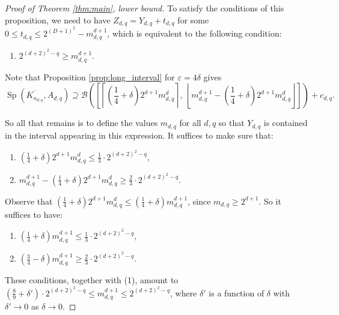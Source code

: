 \documentclass[10pt,a4paper]{article}
\numberwithin{equation}{section}
\newcommand{\eps}{\varepsilon}
\newcommand{\cB}{\mathcal{B}}
\DeclareMathOperator{\Sp}{Sp}
\begin{document}
\begin{proof}[Proof of Theorem \ref{thm:main}, lower bound]
To satisfy the conditions of this proposition, we need to have $Z_{d,q}=Y_{d,q}+t_{d,q}$ for some $0\le t_{d,q} \le 2^{(D+1)^2}-m_{d,q}^{d+1}$, which is equivalent to the following condition:

\begin{enumerate}[label=(\arabic*)]
\item $2^{(d+2)^2-q}\ge m_{d,q}^{d+1}$.
\end{enumerate}

Note that Proposition \ref{prop:long_interval} for $\eps=4\delta$ gives 
$$\Sp(\overline{K_{n_{d,q}}}, A_{d,q})\supseteq  \cB\left(\left[\left\lceil\left(\frac14+\delta\right)2^{d+1}m_{d,q}^d\right\rceil,~ \left\lfloor m_{d,q}^{d+1}-\left(\frac14+\delta\right)2^{d+1}m_{d,q}^d\right\rfloor\right]\right)+c_{d,q}.$$

So all that remains is to define the values $m_{d,q}$ for all $d,q$ so that $Y_{d,q}$ is contained in the interval appearing in this expression. It suffices to make sure that:
\begin{enumerate}[label=(\arabic*)]
\itemsep0em
\setcounter{enumi}{1}
\item $\left(\frac14+\delta\right)2^{d+1}m_{d,q}^d\le \frac13\cdot 2^{(d+2)^2-q}$,
\item $m_{d,q}^{d+1}-\left(\frac14+\delta\right)2^{d+1}m_{d,q}^d\ge \frac23\cdot 2^{(d+2)^2-q}$.
\end{enumerate}

Observe that $\left(\frac14+\delta\right)2^{d+1}m_{d,q}^d\le \left(\frac14+\delta\right)m_{d,q}^{d+1}$, since $m_{d,q}\ge 2^{d+1}$. So it suffices to have:
\begin{enumerate}[label=(\arabic*')]
\itemsep0em
\setcounter{enumi}{1}
\item $\left(\frac14+\delta\right)m_{d,q}^{d+1}\le \frac13\cdot 2^{(d+2)^2-q}$,
\item $\left(\frac34-\delta\right)m_{d,q}^{d+1}\ge \frac23\cdot 2^{(d+2)^2-q}$.
\end{enumerate}

These conditions, together with (1), amount to $\left(\frac89+\delta'\right)\cdot 2^{(d+2)^2-q}\le m_{d,q}^{d+1}\le  2^{(d+2)^2-q}$, where $\delta'$ is a function of $\delta$ with $\delta'\to 0$ as $\delta\to 0$. 


\end{proof}
\end{document}
